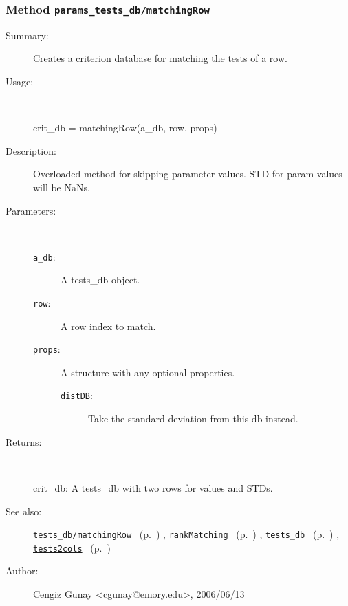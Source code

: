 \subsubsection[Method \texttt{matchingRow}]{Method \texttt{params\_tests\_db/matchingRow}}%
%
\label{ref_params_tests_db__matchingRow}%
\hypertarget{ref_params_tests_db__matchingRow}{}%
\begin{description}
\item[Summary:]Creates a criterion database for matching the tests of a row.
%
\item[Usage:]~%
\begin{lyxcode}%
crit\_db = matchingRow(a\_db, row, props)
%
\end{lyxcode}%
%
\item[Description:]%
Overloaded method for skipping parameter values. STD for param values will be NaNs.
\item[Parameters:]~
\begin{description}%
\item[\texttt{a\_db}:]
 A tests\_db object.
\item[\texttt{row}:]
 A row index to match.
\item[\texttt{props}:]
 A structure with any optional properties.
\begin{description}%
\item[\texttt{distDB}:]
 Take the standard deviation from this db instead.
\end{description}%
\end{description}%
%
\item[Returns:
]~

	crit\_db: A tests\_db with two rows for values and STDs.
%
%
\item[See also:]%
\hyperlink{ref_tests_db__matchingRow}{\texttt{tests\_db/matchingRow}}%
\ (p.~\pageref{ref_tests_db__matchingRow})%
%
, \hyperlink{ref_rankMatching}{\texttt{rankMatching}}%
\ (p.~\pageref{ref_rankMatching})%
%
, \hyperlink{ref_tests_db}{\texttt{tests\_db}}%
\ (p.~\pageref{ref_tests_db})%
%
, \hyperlink{ref_tests2cols}{\texttt{tests2cols}}%
\ (p.~\pageref{ref_tests2cols})%
%
%
\item[Author:]%
Cengiz Gunay <cgunay@emory.edu>, 2006/06/13
%
\end{description}
\methodline%
